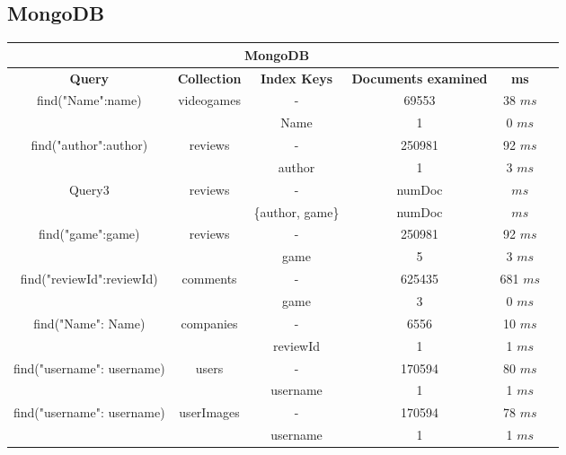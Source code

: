 \subsection{MongoDB}
	\begin{center}
		\begin{tabular}{ |c|c|c|c|c|c| } 
			\hline
			\multicolumn{5}{|c|}{\textbf{MongoDB}}\\
			\hline
			\textbf{Query} & \textbf{Collection} &\textbf{Index Keys} & \textbf{Documents examined} &\textbf{ms} \\ 
			\hline
			\multirow{2}{*}{find({"Name":name})} & \multirow{2}{*}{videogames} & - & 69553 & 38 $ms$ \\ &&Name & 1  & 0 $ms$  \\ 
			\hline
			\multirow{2}{*}{find({"author":author})} & \multirow{2}{*}{reviews} & - & 250981 & 92 $ms$ \\ && author & 1 & 3 $ms$  \\ 
			\hline
			\multirow{2}{*}{Query3} & \multirow{2}{*}{reviews} & - & numDoc & $ms$ \\ && \{author, game\} & numDoc & $ms$  \\ 
			\hline
			\multirow{2}{*}{find({"game":game})} & \multirow{2}{*}{reviews} & - & 250981 & 92 $ms$ \\ && game & 5 & 3 $ms$  \\ 
			\hline
			\multirow{2}{*}{find({"reviewId":reviewId})} & \multirow{2}{*}{comments} & - & 625435 & 681 $ms$ \\ && game & 3 & 0 $ms$  \\ 
			\hline
			\multirow{2}{*}{find({"Name": Name})} & \multirow{2}{*}{companies} & - & 6556 & 10 $ms$ \\ && reviewId & 1 & 1 $ms$  \\ 
			\hline
			\multirow{2}{*}{find({"username": username})} & \multirow{2}{*}{users} & - & 170594 & 80 $ms$ \\ && username & 1 & 1 $ms$  \\
			\hline
			\multirow{2}{*}{find({"username": username})} & \multirow{2}{*}{userImages} & - & 170594 & 78 $ms$ \\ && username & 1 & 1 $ms$  \\  
			\hline
		\end{tabular}
	\end{center}

